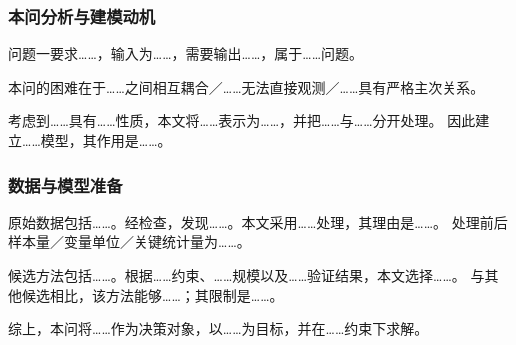\subsubsection{本问分析与建模动机}

问题一要求……，输入为……，需要输出……，属于……问题。

本问的困难在于……之间相互耦合／……无法直接观测／……具有严格主次关系。

考虑到……具有……性质，本文将……表示为……，并把……与……分开处理。
因此建立……模型，其作用是……。


\subsubsection{数据与模型准备}

原始数据包括……。经检查，发现……。本文采用……处理，其理由是……。
处理前后样本量／变量单位／关键统计量为……。

候选方法包括……。根据……约束、……规模以及……验证结果，本文选择……。
与其他候选相比，该方法能够……；其限制是……。


综上，本问将……作为决策对象，以……为目标，并在……约束下求解。
